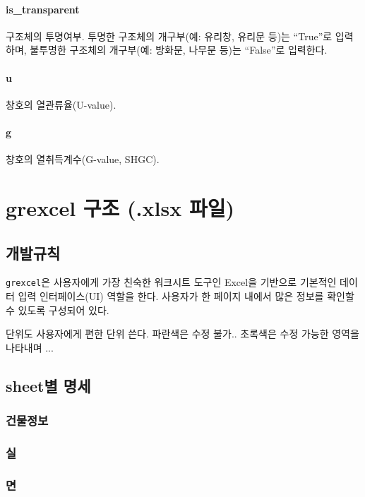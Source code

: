 \paragraph{is\_transparent} 구조체의 투명여부. 투명한 구조체의 개구부(예: 유리창, 유리문 등)는 ``True''로 입력하며, 불투명한 구조체의 개구부(예: 방화문, 나무문 등)는 ``False''로 입력한다.

\paragraph{u} 창호의 열관류율(U-value).

\paragraph{g} 창호의 열취득계수(G-value, SHGC).


\section{grexcel 구조 (.xlsx 파일)}
\subsection{개발규칙}
\texttt{grexcel}은 사용자에게 가장 친숙한 워크시트 도구인 Excel을 기반으로 
기본적인 데이터 입력 인터페이스(UI) 역할을 한다. 사용자가 한 페이지 내에서 많은 정보를 확인할 수 있도록 구성되어 있다.
\par
단위도 사용자에게 편한 단위 쓴다. 파란색은 수정 불가.. 초록색은 수정 가능한 영역을 나타내며 ...

\subsection{sheet별 명세}
\subsubsection{건물정보}

\subsubsection{실}

\subsubsection{면}

